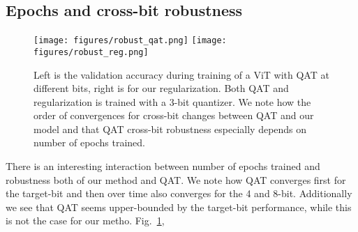 \subsection{Epochs and cross-bit robustness}
\begin{figure}[H]
    \centering
    \texttt{[image: figures/robust\_qat.png]}
    \hfill
    \texttt{[image: figures/robust\_reg.png]}
    \caption{Left is the validation accuracy during training of a ViT with QAT at different bits, right is for our regularization. Both QAT and regularization is trained with a 3-bit quantizer. We note how the order of convergences for cross-bit changes between QAT and our model and that QAT cross-bit robustness especially depends on number of epochs trained.}
    \label{fig:robustness_during_training}
\end{figure}
There is an interesting interaction between number of epochs trained and robustness both of our method and QAT. We note how QAT converges first for the target-bit and then over time also converges for the 4 and 8-bit. Additionally we see that QAT seems upper-bounded by the target-bit performance, while this is not the case for our metho.
Fig.~\ref{fig:robustness_during_training}, 


